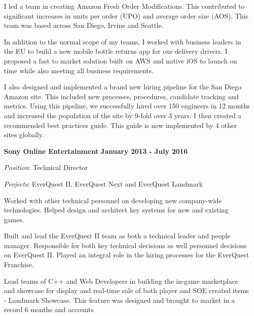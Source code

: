 \documentclass{article}
\begin{document}
\par
\vspace{\baselineskip}
I led a team in creating Amazon Fresh Order Modifications.  This contributed to significant increases in units per order (UPO) and average order size (AOS). This team was based across San Diego, Irvine and Seattle.
\par
\vspace{\baselineskip}
In addition to the normal scope of my teams, I worked with business leaders in the EU to build a new mobile bottle returns app for our delivery drivers. I proposed a fast to market solution built on AWS and native iOS to launch on time while also meeting all business requirements.
\par
\vspace{\baselineskip}
I also designed and implemented a brand new hiring pipeline for the San Diego Amazon site. This included new processes, procedures, candidate tracking and metrics.  Using this pipeline, we successfully hired over 150 engineers in 12 months and increased the population of the site by 9-fold over 3 years. I then created a recommended best practices guide. This guide is now implemented by 4 other sites globally. 
\par
\vspace{\baselineskip}
{\bf Sony Online Entertainment}
\hfill {\bf January 2013 - July 2016}
\vspace{.03in}
\par
{\it Position}: Technical Director
\par
{\it Projects}: EverQuest II, EverQuest Next and EverQuest Landmark
\vspace{\baselineskip}
\par
Worked with other technical personnel on developing new company-wide
technologies.  Helped design and architect key systems for new and existing
games.
\par
\vspace{\baselineskip}
Built and lead the EverQuest II team as both a technical leader and people manager.  Responsible for both key technical decisions as well personnel decisions on EverQuest II.  Played an integral role in the hiring processes for the EverQuest Franchise.
\par
\vspace{\baselineskip}
Lead teams of C++ and Web Developers in building the
in-game marketplace and showcase for display and real-time sale of both player and SOE created items - 
Landmark Showcase.  This
feature was designed and brought to market in a record 6 months and accounts
\end{document}
